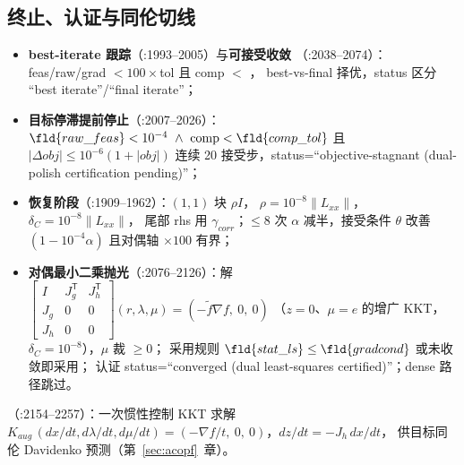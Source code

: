 \subsection{终止、认证与同伦切线}
\begin{itemize}
  \item \textbf{best-iterate 跟踪}（:1993--2005）与\textbf{可接受收敛}
        （:2038--2074）：feas/raw/grad $<100\times$tol 且 comp $<$ ，
        best-vs-final 择优，status 区分 ``best iterate''/``final iterate''；
  \item \textbf{目标停滞提前停止}（:2007--2026）：$\fld{raw\_feas}<10^{-4}\ \land\
        \mathrm{comp}<\fld{comp\_tol}$ 且 $|\Delta obj|\le10^{-6}(1+|obj|)$
        连续 20 接受步，status=``objective-stagnant (dual-polish certification pending)''；
  \item \textbf{恢复阶段}（:1909--1962）：$(1,1)$ 块 $\rho I$，
        $\rho=10^{-8}\lVert L_{xx}\rVert$，$\delta_C=10^{-8}\lVert L_{xx}\rVert$，
        尾部 rhs 用 $\gamma_{corr}$；$\le8$ 次 $\alpha$ 减半，接受条件 $\theta$ 改善
        $(1-10^{-4}\alpha)$ 且对偶轴 $\times100$ 有界；
  \item \textbf{对偶最小二乘抛光}（:2076--2126）：解
        $\begin{bmatrix}I & J_g^{\mathsf T} & J_h^{\mathsf T}\\ J_g & 0 & 0\\
        J_h & 0 & 0\end{bmatrix}(r,\lambda,\mu)=(-\tilde f\nabla f,\ 0,\ 0)$
        （$z=0$、$\mu=e$ 的增广 KKT，$\delta_C=10^{-8}$），$\mu$ 裁 $\ge0$；
        采用规则 $\fld{stat\_ls}\le\fld{gradcond}$ 或未收敛即采用；
        认证 status=``converged (dual least-squares certified)''；dense 路径跳过。
\end{itemize}
（:2154--2257）：一次惯性控制 KKT 求解
$K_{aug}\,(dx/dt,d\lambda/dt,d\mu/dt)=(-\nabla f/t,\ 0,\ 0)$，$dz/dt=-J_h\,dx/dt$，
供目标同伦 Davidenko 预测（第~\ref{sec:acopf}~章）。

